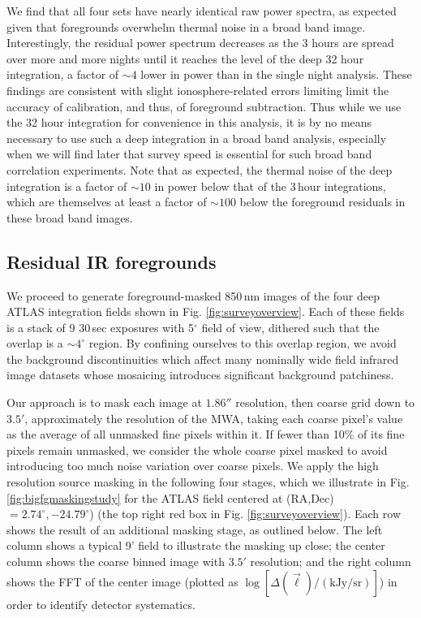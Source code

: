 \documentclass{emulateapj}
\begin{document}
We find that all four sets have nearly identical raw power spectra, as expected given that foregrounds overwhelm thermal noise in a broad band image. Interestingly, the residual power spectrum decreases as the 3 hours are spread over more and more nights until it reaches the level of the deep 32 hour integration, a factor of $\sim4$ lower in power than in the single night analysis. These findings are consistent with slight ionosphere-related errors limiting limit the accuracy of calibration, and thus, of foreground subtraction. Thus while we use the 32 hour integration for convenience in this analysis, it is by no means necessary to use such a deep integration in a broad band analysis, especially when we will find later that survey speed is essential for such broad band correlation experiments. Note that as expected, the thermal noise of the deep integration is a factor of $\sim10$ in power below that of the 3\,hour integrations, which are themselves at least a factor of $\sim100$ below the foreground residuals in these broad band images.

\subsection{Residual IR foregrounds}
\label{sec:resirfg}

We proceed to generate foreground-masked 850\,nm images of the four deep ATLAS integration fields shown in Fig. \ref{fig:surveyoverview}. Each of these fields is a stack of 9 30\,sec exposures with 5$^\circ$ field of view, dithered such that the overlap is a $\sim4^\circ$ region. By confining ourselves to this overlap region, we avoid the background discontinuities which affect many nominally wide field infrared image datasets whose mosaicing introduces significant background patchiness. 

Our approach is to mask each image at $1.86''$ resolution, then coarse grid down to $3.5'$, approximately the resolution of the MWA, taking each coarse pixel's value as the average of all unmasked fine pixels within it. If fewer than 10\% of its fine pixels remain unmasked, we consider the whole coarse pixel masked to avoid introducing too much noise variation over coarse pixels. We apply the high resolution source masking in the following four stages, which we illustrate in Fig. \ref{fig:bigfgmaskingstudy} for the ATLAS field centered at (RA,Dec)$=2.74^\circ, -24.79^\circ$) (the top right red box in Fig. \ref{fig:surveyoverview}). Each row shows the result of an additional masking stage, as outlined below. The left column shows a typical 9' field to illustrate the masking up close; the center column shows the coarse binned image with $3.5'$ resolution; and the right column shows the FFT of the center image (plotted as $\log[\Delta(\vec{\ell})/(\text{kJy/sr})]$) in order to identify detector systematics. 
\end{document}
